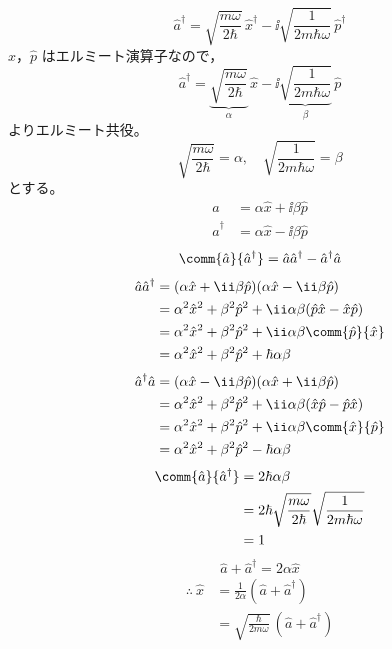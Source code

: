 \[ \hat{a}^{\dagger}=\sqrt{\frac{m\omega}{2\hbar}}\,\hat{x}^{\dagger}-\ii\sqrt{\frac{1}{2m\hbar\omega}}\,\hat{p}^{\dagger} \]
$\hat{x}$，$\hat{p}$ はエルミート演算子なので，
\[ \hat{a}^{\dagger}=\underbrace{\sqrt{\frac{m\omega}{2\hbar}}}_{\alpha}\,\hat{x}-\ii\underbrace{\sqrt{\frac{1}{2m\hbar\omega}}}_{\beta}\,\hat{p} \]
よりエルミート共役。
\[ \sqrt{\frac{m\omega}{2\hbar}}=\alpha,\quad\sqrt{\frac{1}{2m\hbar\omega}}=\beta \]
とする。
\begin{align*}
\hat{a}&=\alpha\hat{x}+\ii\beta\hat{p}\\
\hat{a}^{\dagger}&=\alpha\hat{x}-\ii\beta\hat{p}
\end{align*}
\[ \comm{\hat{a}}{\hat{a}^{\dagger}}=\hat{a}\hat{a}^{\dagger}-\hat{a}^{\dagger}\hat{a} \]
\begin{align*}
\hat{a}\hat{a}^{\dagger}&=(\alpha\hat{x}+\ii\beta\hat{p})(\alpha\hat{x}-\ii\beta\hat{p})\\
&=\alpha^{2}\hat{x}^{2}+\beta^{2}\hat{p}^{2}+\ii\alpha\beta(\hat{p}\hat{x}-\hat{x}\hat{p})\\
&=\alpha^{2}\hat{x}^{2}+\beta^{2}\hat{p}^{2}+\ii\alpha\beta\comm{\hat{p}}{\hat{x}}\\
&=\alpha^{2}\hat{x}^{2}+\beta^{2}\hat{p}^{2}+\hbar\alpha\beta
\end{align*}
\begin{align*}
\hat{a}^{\dagger}\hat{a}&=(\alpha\hat{x}-\ii\beta\hat{p})(\alpha\hat{x}+\ii\beta\hat{p})\\
&=\alpha^{2}\hat{x}^{2}+\beta^{2}\hat{p}^{2}+\ii\alpha\beta(\hat{x}\hat{p}-\hat{p}\hat{x})\\
&=\alpha^{2}\hat{x}^{2}+\beta^{2}\hat{p}^{2}+\ii\alpha\beta\comm{\hat{x}}{\hat{p}}\\
&=\alpha^{2}\hat{x}^{2}+\beta^{2}\hat{p}^{2}-\hbar\alpha\beta
\end{align*}
\begin{align*}
\comm{\hat{a}}{\hat{a}^{\dagger}}&=2\hbar\alpha\beta\\
&=2\hbar\sqrt{\frac{m\omega}{2\hbar}}\sqrt{\frac{1}{2m\hbar\omega}}\\
&=1
\end{align*}
\[ \hat{a}+\hat{a}^{\dagger}=2\alpha\hat{x} \]
\begin{align*}
\therefore\ \hat{x}&=\frac{1}{2\alpha}(\hat{a}+\hat{a}^{\dagger})\\
&=\sqrt{\frac{\hbar}{2m\omega}}\,(\hat{a}+\hat{a}^{\dagger})
\end{align*}
